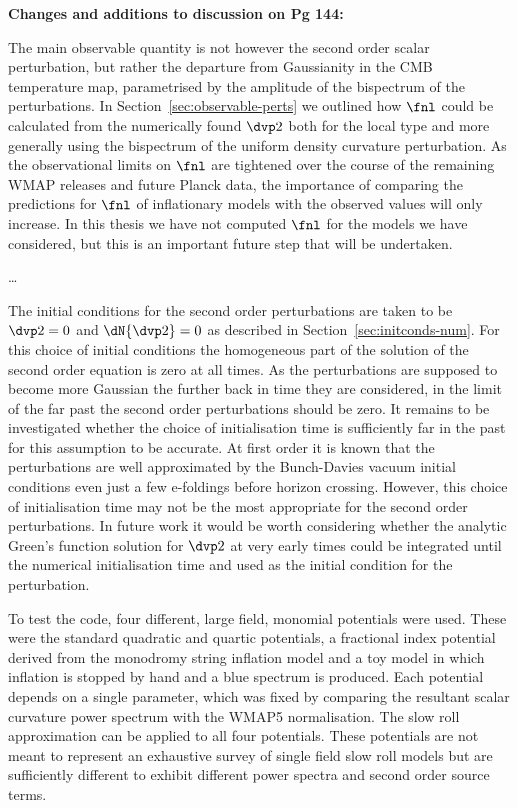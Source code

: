 \textbf{Changes and additions to discussion on Pg 144:}

The main observable quantity is not however the second order scalar perturbation, but rather the
departure from Gaussianity in the CMB temperature map, parametrised by the amplitude of the
bispectrum of the perturbations. In Section~\ref{sec:observable-perts} we outlined how $\fnl$ could
be calculated from the numerically found $\dvp2$ both for the local type and more generally using
the bispectrum of the uniform density curvature perturbation. As the observational limits on $\fnl$
are tightened over the course of the remaining WMAP releases and future Planck data, the importance
of comparing the predictions for $\fnl$ of inflationary models with the observed values will only
increase. In this thesis we have not computed $\fnl$ for the models we have considered, but this is
an important future step that will be undertaken.
 
\ldots

The initial conditions for the second order perturbations are taken to be $\dvp2=0$ and
$\dN{\dvp2}=0$ as described in Section~\ref{sec:initconds-num}. For this choice of initial
conditions the homogeneous part of the solution of the second order equation is zero at all times.
As the perturbations are supposed to become more Gaussian the further back in time they are
considered, in the limit of the far past the second order perturbations should be zero. It remains
to be investigated whether the choice of initialisation time is sufficiently far in the past for
this assumption to be accurate. At first order it is known that the perturbations are well
 approximated by the Bunch-Davies vacuum initial conditions even just a few e-foldings before
horizon crossing. However, this choice of initialisation time may not be the most appropriate for
the second order perturbations. In future work it would be worth considering whether the analytic
Green's function solution for $\dvp2$ at very early times could be integrated until the numerical
initialisation time and used as the initial condition for the perturbation. 

To test the code, four different, large field, monomial potentials were used. These were the
standard quadratic and quartic potentials, a fractional index potential derived from the monodromy
string inflation model and a toy model in which inflation is stopped by hand and a blue spectrum is
produced.
Each potential depends on a single parameter, which was fixed by comparing the resultant scalar
curvature power spectrum with the WMAP5 normalisation. The slow roll
approximation can be applied to all four potentials. These potentials are not meant to represent an
exhaustive survey of single field slow roll models but are sufficiently different to exhibit
different power spectra and second order source terms.

